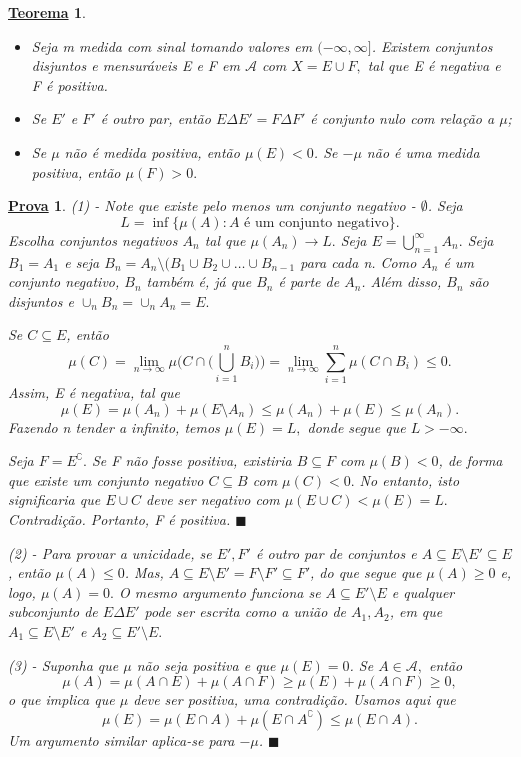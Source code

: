 \documentclass{article}
\newtheorem*{theorem*}{\underline{Teorema}}
\newtheorem*{proof*}{\underline{Prova}}
\renewcommand\qedsymbol{$\blacksquare$}
\begin{document}
 \hypertarget{hahn}{
\begin{theorem*}
 \begin{itemize}
   \item[1)] Seja m medida com sinal tomando valores em \((-\infty, \infty]\). Existem conjuntos disjuntos e mensuráveis E e F em \(\mathcal{A}\) com \(X = E \cup F,\) tal que E é negativa e F é positiva.
    \item[2)] Se \(E'\) e \(F'\) é outro par, então \(E\Delta E' = F\Delta F'\) é conjunto nulo com relação a \(\mu \);
      \item[3)] Se \(\mu \) não é medida positiva, então \(\mu (E) < 0\). Se \(-\mu \) não é uma medida positiva, então \(\mu (F) > 0.\)
 \end{itemize}
\end{theorem*}}
\begin{proof*}
  (1) - Note que existe pelo menos um conjunto negativo - \(\emptyset \). Seja 
    \[
      L = \inf_{}\{\mu (A): A \text{ é um conjunto negativo}\}.
    \]
  Escolha conjuntos negativos \(A_{n}\) tal que \(\mu (A_{n})\to L.\)  Seja \(E = \bigcup_{n=1}^{\infty}A_{n}.\) Seja \(B_1 = A_1\) e seja \(B_{n} = A_{n}\setminus{(B_1\cup B_2\cup \dotsc \cup B_{n-1}}\) para cada n. Como \(A_{n}\) é um conjunto negativo, \(B_{n}\) também é, já que \(B_{n}\) é parte de \(A_{n}\). 
Além disso, \(B_{n}\) são disjuntos e \(\cup _n B_{n} = \cup_{n}^{}A_{n} = E.\)

  Se \(C\subseteq E\), então 
    \[
      \mu (C) = \lim_{n\to \infty}\mu \biggl(C\cap \biggl(\bigcup_{i=1}^{n}B_{i}\biggr)\biggr) = \lim_{n\to \infty}\sum\limits_{i=1}^{n}\mu (C\cap B_{i}) \leq 0.
    \]
  Assim, E é negativa, tal que 
    \[
      \mu (E) = \mu (A_{n}) + \mu (E\setminus{A_{n}}) \leq \mu (A_{n}) + \mu (E) \leq \mu (A_{n}).
    \]
  Fazendo n tender a infinito, temos \(\mu (E) = L,\) donde segue que \(L> -\infty.\) 

  Seja \(F = E ^{\complement}.\) Se F não fosse positiva, existiria \(B\subseteq F\) com \(\mu (B) < 0\), de forma que existe um conjunto negativo \(C\subseteq B\) com \(\mu (C) < 0.\) No entanto, isto significaria que 
 \(E\cup C\) deve ser negativo com \(\mu (E\cup C) < \mu (E) = L.\) Contradição. Portanto, F é positiva. \qedsymbol

  (2) - Para provar a unicidade, se \(E', F'\) é outro par de conjuntos e \(A\subseteq E\setminus{E'}\subseteq E\), então \(\mu (A) \leq 0\). Mas, \(A\subseteq E\setminus{E'} = F\setminus{F'}\subseteq F'\), do que segue que \(\mu (A)\geq 0\) e, logo, 
  \(\mu (A)=0.\) O mesmo argumento funciona se \(A\subseteq E'\setminus{E}\) e qualquer subconjunto de \(E\Delta E'\) pode ser escrita como a união de \(A_1, A_2\), em que \(A_1\subseteq E\setminus{E'}\) e \(A_2\subseteq E'\setminus{E}.\)

  (3) - Suponha que \(\mu \) não seja positiva e que \(\mu (E) = 0\). Se \(A\in \mathcal{A},\) então 
    \[
      \mu (A) = \mu (A\cap E) + \mu (A\cap F) \geq \mu (E) + \mu (A\cap F)\geq 0,
    \]
  o que implica que \(\mu \) deve ser positiva, uma contradição. Usamos aqui que 
    \[
      \mu (E) = \mu (E\cap A) + \mu (E\cap A ^{\complement}) \leq \mu (E\cap A).
    \]
  Um argumento similar aplica-se para \(-\mu \). \qedsymbol
\end{proof*}
\end{document}
